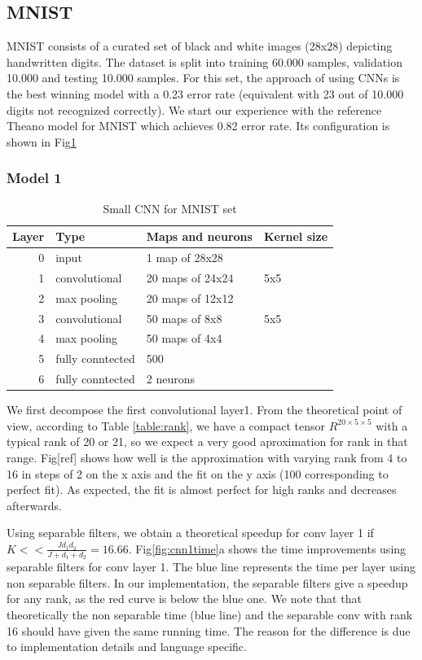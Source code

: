 \documentclass{article} %
\begin{document}
\subsection{MNIST}
MNIST consists of a curated set of black and white images (28x28) depicting handwritten digits.
The dataset is split into training 60.000 samples, validation 10.000 and testing
10.000 samples. For this set, the approach of \cite{DBLP:journals/corr/abs-1202-2745} using CNNs is the best winning model with a 0.23 error rate (equivalent with 23 out of 10.000 digits not recognized correctly).
We start our experience with the reference Theano model for MNIST which achieves 0.82 error rate. Its configuration is shown in Fig\ref{fig:cnn1}
\subsubsection{Model 1}
\begin{table}
\centering
\begin{tabular}{@{}rlll@{}}\toprule
Layer & Type & Maps and neurons& Kernel size \\ \midrule
0 & input & 1 map of 28x28 &\\
1& convolutional & 20 maps of 24x24 & 5x5\\
2 & max pooling & 20 maps of 12x12 &  \\
3 & convolutional & 50 maps of 8x8& 5x5 \\
4 & max pooling & 50 maps of 4x4&  \\ 
5 & fully conntected& 500 & \\
6 & fully conntected & 2 neurons & \\ \bottomrule
\end{tabular}
\caption{Small CNN for MNIST set}
\label{fig:cnn1}
\end{table}

We first decompose the first convolutional layer1.  From the theoretical point of view, according to Table \ref{table:rank}, we have a compact tensor $R^{20\times 5 \times 5}$ with a typical rank of 20 or 21, so we expect a very good aproximation for rank in that range. 
Fig[ref] shows how well is the approximation with varying rank from 4 to 16 in steps of 2 on the x axis and the fit on the y axis (100 corresponding to perfect fit). As expected, the fit is almost perfect for high ranks and decreases afterwards.

Using separable filters, we obtain a theoretical speedup for conv layer 1 if $K<< \frac{Jd_{1}d_{2}}{J +d_{1}+d_{2}} = 16.66$. Fig\ref{fig:cnn1time}a shows the time improvements using separable filters for conv layer 1. The blue line represents the time per layer using non separable filters. In our implementation, the separable filters give a speedup for any rank, as the red curve is below the blue one. 
We note that that theoretically the non separable time (blue line) and the separable conv with rank 16 should have given the same running time. The reason for the difference is due to implementation details and language specific.
\end{document}
